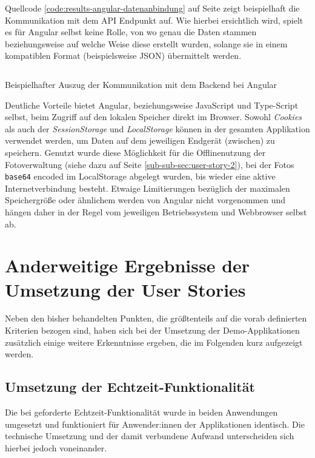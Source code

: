 \documentclass[a4paper,12pt,twoside]{scrreprt}
\begin{document}
Quellcode \ref{code:results-angular-datenanbindung} auf Seite \pageref{code:results-angular-datenanbindung} zeigt beispielhaft die Kommunikation mit dem  API Endpunkt auf. Wie hierbei ersichtlich wird, spielt es für Angular selbst keine Rolle, von wo genau die Daten stammen beziehungsweise auf welche Weise diese erstellt wurden, solange sie in einem kompatiblen Format (beispielsweise \acs{JSON}) übermittelt werden.

\begin{listing}[ht]
    \renewcommand{\fcolorbox}[4][]{#4}
    \inputminted[fontsize=\footnotesize,linenos,breaklines]{js}{code/Luidold_Results-Angular-Datenanbindung-CodeSample.ts}
    \caption[Beispielhafter Auszug der Kommunikation mit dem Backend bei Angular]{Beispielhafter Auszug der Kommunikation mit dem Backend bei Angular}
    \label{code:results-angular-datenanbindung}
\end{listing}

Deutliche Vorteile bietet Angular, beziehungsweise JavaScript und Type-Script selbst, beim Zugriff auf den lokalen Speicher direkt im Browser. Sowohl \textit{Cookies} als auch der \textit{SessionStorage} und \textit{LocalStorage} können in der gesamten Applikation verwendet werden, um Daten auf dem jeweiligen Endgerät (zwischen) zu speichern. Genutzt wurde diese Möglichkeit für die Offlinenutzung der Fotoverwaltung (siehe dazu \textit{} auf Seite \ref{sub-sub-sec:user-story-2}), bei der Fotos \texttt{base64} encoded im LocalStorage abgelegt wurden, bis wieder eine aktive Internetverbindung besteht. Etwaige Limitierungen bezüglich der maximalen Speichergröße oder ähnlichem werden von Angular nicht vorgenommen und hängen daher in der Regel vom jeweiligen Betriebssystem und Webbrowser selbst ab.

\section{Anderweitige Ergebnisse der Umsetzung der User Stories}
\label{sec:results-user-stories}
Neben den bisher behandelten Punkten, die größtenteils auf die vorab definierten Kriterien bezogen sind, haben sich bei der Umsetzung der Demo-Applikationen zusätzlich einige weitere Erkenntnisse ergeben, die im Folgenden kurz aufgezeigt werden.

\subsection{Umsetzung der Echtzeit-Funktionalität}
\label{sub-sec:results-user-stories-echtzeit}
Die bei \textit{} geforderte Echtzeit-Funktionalität wurde in beiden Anwendungen umgesetzt und funktioniert für Anwender:innen der Applikationen identisch. Die technische Umsetzung und der damit verbundene Aufwand unterscheiden sich hierbei jedoch voneinander.
\end{document}
